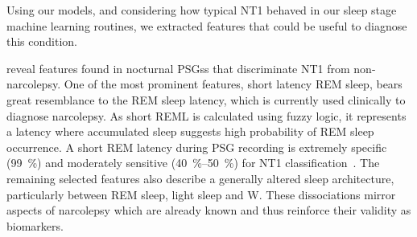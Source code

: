 Using our models, and considering how typical \ac{NT1} behaved in our sleep stage machine learning routines, we extracted features that could be useful to diagnose this condition.

 reveal features found in nocturnal \acp{PSG}s that discriminate \ac{NT1} from non-narcolepsy. 
One of the most prominent features, short latency \ac{REM} sleep, bears great resemblance to the \ac{REM} sleep latency, which is currently used clinically to diagnose narcolepsy. As short \ac{REML} is calculated using fuzzy logic, it represents a latency where accumulated sleep suggests high probability of \ac{REM} sleep occurrence. 
A short \ac{REM} latency during \ac{PSG} recording is extremely specific (\SI{99}{\percent}) and moderately sensitive (\SIrange{40}{50}{\percent}) for \ac{NT1} classification~\cite{Andlauer2013,Reiter2015}. 
The remaining selected features also describe a generally altered sleep architecture, particularly between \ac{REM} sleep, light sleep and \ac{W}.
These dissociations mirror aspects of narcolepsy which are already known and thus reinforce their validity as biomarkers.

